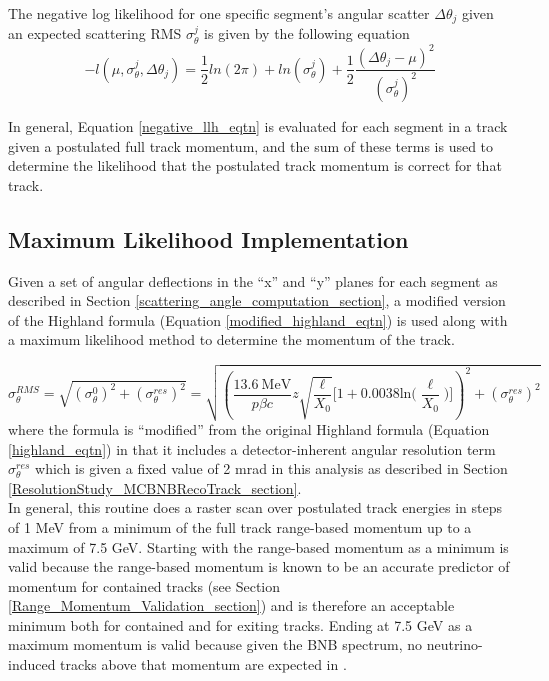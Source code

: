The negative log likelihood for one specific segment's angular scatter $\Delta\theta_j$ given an expected scattering RMS $\sigma_\theta^j$ is given by the following equation
\begin{equation}\label{negative_llh_eqtn}
-l(\mu, \sigma_\theta^j, \Delta\theta_j) = \frac{1}{2}ln(2\pi) + ln(\sigma_\theta^j) + \frac{1}{2}\frac{(\Delta\theta_j-\mu)^2}{(\sigma_\theta^j)^2}
\end{equation}

In general, Equation \ref{negative_llh_eqtn} is evaluated for each segment in a track given a postulated full track momentum, and the sum of these terms is used to determine the likelihood that the postulated track momentum is correct for that track.


\subsection{Maximum Likelihood Implementation}\label{maximum_likelihood_section}

Given a set of angular deflections in the ``x'' and ``y'' planes for each segment as described in Section \ref{scattering_angle_computation_section}, a modified version of the Highland formula (Equation \ref{modified_highland_eqtn}) is used along with a maximum likelihood method to determine the momentum of the track. 

\begin{equation}\label{modified_highland_eqtn}
\sigma_{\theta}^{RMS} = \sqrt{ (\sigma_\theta^0)^2 + (\sigma_\theta^{res})^2} = \sqrt{ (\frac{13.6\  \text{MeV}}{p\beta c}z\sqrt{\frac{\ell}{X_0}}\Big[1+0.0038\text{ln}\Big(\frac{\ell}{X_0}\Big)\Big])^2 + (\sigma_\theta^{res})^2 }
\end{equation}
where the formula is ``modified'' from the original Highland formula (Equation \ref{highland_eqtn}) in that it includes a detector-inherent angular resolution term $\sigma_\theta^{res}$ which is given a fixed value of 2 mrad in this analysis as described in Section \ref{ResolutionStudy_MCBNBRecoTrack_section}\cite{leonidas2}.\\

In general, this routine does a raster scan over postulated track energies in steps of 1 MeV from a minimum of the full track range-based momentum up to a maximum of 7.5 GeV. Starting with the range-based momentum as a minimum is valid because the range-based momentum is known to be an accurate predictor of momentum for contained tracks (see Section \ref{Range_Momentum_Validation_section}) and is therefore an acceptable minimum both for contained and for exiting tracks. Ending at 7.5 GeV as a maximum momentum is valid because given the BNB spectrum, no neutrino-induced tracks above that momentum are expected in {\ub}.\\

